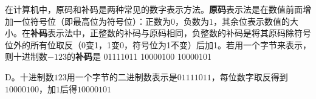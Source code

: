 \begin{groups}
\begin{questions}[rp]
\question
{}在计算机中，原码和补码是两种常见的数字表示方法。\textbf{原码}表示法是在数值前面增加一位符号位（即最高位为符号位）：正数为$0$，负数为$1$，其余位表示数值的大小。在\textbf{补码}表示法中，正整数的补码与原码相同，负整数的补码是将其原码除符号位外的所有位取反（0变1，1变0，符号位为1不变）后加1。若用一个字节来表示，则十进制数$-123$的\textbf{补码}是
{01111011}
{10000100}
{10000101}
\begin{solution}
D。十进制数$123$用一个字节的二进制数表示是$01111011$，每位数字取反得到$10000100$，加$1$后得$10000101$
\end{solution}




\end{questions}
\end{groups}
